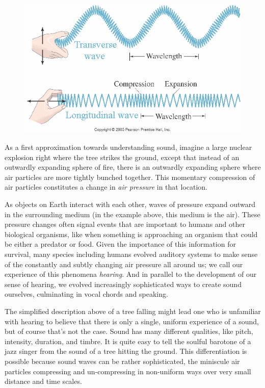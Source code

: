 \documentclass[UTF8]{book}
\begin{document}
\begin{CJK}{UTF8}{gbsn}
\begin{figure}[H]
\centering
\includegraphics[width=0.8\linewidth]{longvstransvwave}
\end{figure}

As a first approximation towards understanding sound, imagine a large nuclear explosion right where the tree strikes the ground, except that instead of an outwardly expanding sphere of fire, there is an outwardly expanding sphere where air particles are more tightly bunched together. This momentary compression of air particles constitutes a change in \emph{air pressure} in that location.

As objects on Earth interact with each other, waves of pressure expand outward in the surrounding medium (in the example above, this medium is the air). These pressure changes often signal events that are important to humans and other biological organisms, like when something is approaching an organism that could be either a predator or food. Given the importance of this information for survival, many species including humans evolved auditory systems to make sense of the constantly and subtly changing air pressure all around us; we call our experience of this phenomena \emph{hearing}. And in parallel to the development of our sense of hearing, we evolved increasingly sophisticated ways to create sound ourselves, culminating in vocal chords and speaking.

The simplified description above of a tree falling might lead one who is unfamiliar with hearing to believe that there is only a single, uniform experience of a sound, but of course that's not the case. Sound has many different qualities, like pitch, intensity, duration, and timbre. It is quite easy to tell the soulful barotone of a jazz singer from the sound of a tree hitting the ground. This differentiation is possible because sound waves can be rather sophisticated, the miniscule air particles compressing and un-compressing in non-uniform ways over very small distance and time scales.


\end{CJK}
\end{document}
